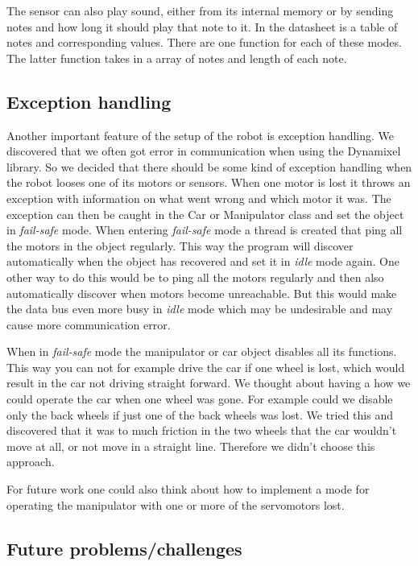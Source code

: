 The sensor can also play sound, either from its internal memory or by sending notes and how long it should play that note to it. In the datasheet is a table of notes and corresponding values. There are one function for each of these modes. The latter function takes in a array of notes and length of each note.

\subsection{Exception handling}

Another important feature of the setup of the robot is exception handling. We discovered that we often got error in communication when using the Dynamixel library. So we decided that there should be some kind of exception handling when the robot looses one of its motors or sensors. When one motor is lost it throws an exception with information on what went wrong and which motor it was. The exception can then be caught in the Car or Manipulator class and set the object in \textit{fail-safe} mode. When entering \textit{fail-safe} mode a thread is created that ping all the motors in the object regularly. This way the program will discover automatically when the object has recovered and set it in \textit{idle} mode again. One other way to do this would be to ping all the motors regularly and then also automatically discover when motors become unreachable. But this would make the data bus even more busy in \textit{idle} mode which may be undesirable and may cause more communication error.

When in \textit{fail-safe} mode the manipulator or car object disables all its functions. This way you can not for example drive the car if one wheel is lost, which would result in the car not driving straight forward. We thought about having a how we could operate the car when one wheel was gone. For example could we disable only the back wheels if just one of the back wheels was lost. We tried this and discovered that it was to much friction in the two wheels that the car wouldn't move at all, or not move in a straight line. Therefore we didn't choose this approach. 

For future work one could also think about how to implement a mode for operating the manipulator with one or more of the servomotors lost.

\subsection{Future problems/challenges}


